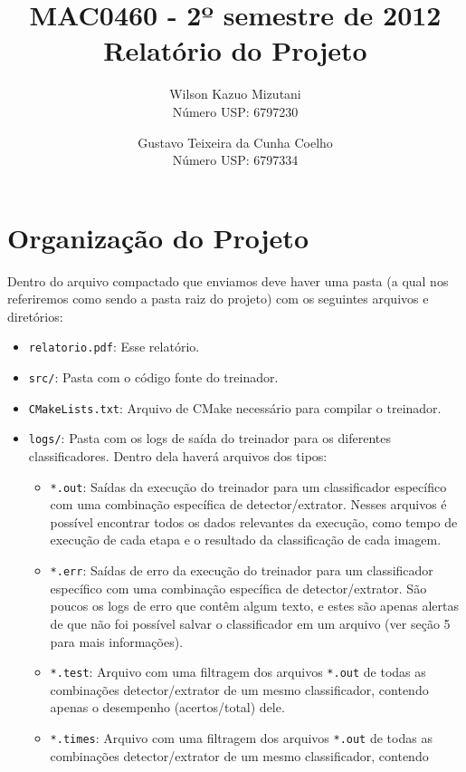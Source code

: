 \documentclass[a4paper,11pt]{article}
\title{MAC0460 - 2º semestre de 2012 \\ Relatório do Projeto}
\author{
  Wilson Kazuo Mizutani\\
  Número USP: 6797230
  \and
  Gustavo Teixeira da Cunha Coelho\\
  Número USP: 6797334
}
\begin{document}
\maketitle

\section{Organização do Projeto}

  Dentro do arquivo compactado que enviamos deve haver uma pasta (a qual nos
  referiremos como sendo a pasta raiz do projeto) com os seguintes arquivos e
  diretórios:

  \begin{itemize}
    \item \verb$relatorio.pdf$:
      Esse relatório.
    \item \verb$src/$:
      Pasta com o código fonte do treinador.
    \item \verb$CMakeLists.txt$:
      Arquivo de CMake necessário para compilar o treinador.
    \item \verb$logs/$:
      Pasta com os logs de saída do treinador para os diferentes
      classificadores. Dentro dela haverá arquivos dos tipos:
      \begin{itemize}
        \item \verb$*.out$:
          Saídas da execução do treinador para um classificador específico com
          uma combinação específica de detector/extrator. Nesses arquivos é
          possível encontrar todos os dados relevantes da execução, como tempo
          de execução de cada etapa e o resultado da classificação de cada
          imagem.
        \item \verb$*.err$:
          Saídas de erro da execução do treinador para um classificador
          específico com uma combinação específica de detector/extrator. São
          poucos os logs de erro que contêm algum texto, e estes são apenas
          alertas de que não foi possível salvar o classificador em um arquivo
          (ver seção 5 para mais informações).
        \item \verb$*.test$:
          Arquivo com uma filtragem dos arquivos \verb$*.out$ de todas as
          combinações detector/extrator de um mesmo classificador, contendo
          apenas o desempenho (acertos/total) dele.
        \item \verb$*.times$:
          Arquivo com uma filtragem dos arquivos \verb$*.out$ de todas as
          combinações detector/extrator de um mesmo classificador, contendo

\end{itemize}
\end{itemize}
\end{document}
